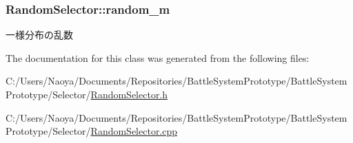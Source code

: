 \subsubsection[{random\+\_\+m}]{ Random\+Selector\+::random\+\_\+m}\label{class_random_selector_adbb8b79d964616048efb5554da2eb561}
一様分布の乱数 

The documentation for this class was generated from the following files\+:\begin{DoxyCompactItemize}
\item 
C\+:/\+Users/\+Naoya/\+Documents/\+Repositories/\+Battle\+System\+Prototype/\+Battle\+System\+Prototype/\+Selector/\hyperlink{_random_selector_8h}{Random\+Selector.\+h}\item 
C\+:/\+Users/\+Naoya/\+Documents/\+Repositories/\+Battle\+System\+Prototype/\+Battle\+System\+Prototype/\+Selector/\hyperlink{_random_selector_8cpp}{Random\+Selector.\+cpp}\end{DoxyCompactItemize}
